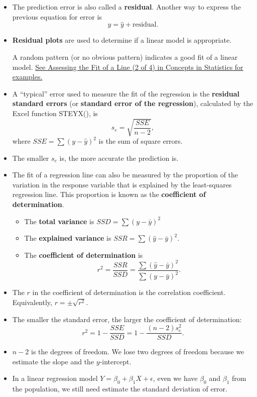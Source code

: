 \begin{itemize}
\item
  The prediction error is also called a \textbf{residual}. Another way
  to express the previous equation for error is
  \[y=\hat{y}+\text{residual}.\]
\item
  \textbf{Residual plots} are used to determine if a linear model is
  appropriate.

  A random pattern (or no obvious pattern) indicates a good fit of a
  linear model.
  \href{https://courses.lumenlearning.com/wmopen-concepts-statistics/chapter/assessing-the-fit-of-a-line-2-of-4/}{See
  Assessing the Fit of a Line (2 of 4) in Concepts in Statistics for
  examples.}
\item
  A ``typical'' error used to measure the fit of the regression is the
  \textbf{residual standard errors} (or \textbf{standard error of the
  regression}), calculated by the Excel function \textsf{STEYX()}, is
  \[s_e=\sqrt{\dfrac{SSE}{n-2}},\] where \(SSE=\sum (y-\hat{y})^2\) is
  the sum of square errors.
\item
  The smaller \(s_e\) is, the more accurate the prediction is.
\item
  The fit of a regression line can also be measured by the proportion of
  the variation in the response variable that is explained by the
  least-squares regression line. This proportion is known as the
  \textbf{coefficient of determination}.

  \begin{itemize}
  \item
    The \textbf{total variance} is \(SSD=\sum(y-\bar{y})^2\)
  \item
    The \textbf{explained variance} is \(SSR=\sum(\hat{y}-\bar{y})^2\).
  \item
    The \textbf{coefficient of determination} is
    \[r^2=\dfrac{SSR}{SSD}=\dfrac{\sum(\hat{y}-\bar{y})^2}{\sum(y-\bar{y})^2}.\]
  \end{itemize}
\end{itemize}

\begin{remark}

\begin{itemize}
\item
  The \(r\) in the coefficient of determination is the correlation
  coefficient. Equivalently, \(r=\pm\sqrt{r^2}\).
\item
  The smaller the standard error, the larger the coefficient of
  determination: \[r^2=1-\dfrac{SSE}{SSD}=1-\dfrac{(n-2)s_e^2}{SSD}.\]
\item
  \(n-2\) is the degrees of freedom. We lose two degrees of freedom
  because we estimate the slope and the \(y\)-intercept.
\item
  In a linear regression model \(Y=\beta_0 + \beta_1 X +\epsilon\), even
  we have \(\beta_0\) and \(\beta_1\) from the population, we still need
  estimate the standard deviation of error.
\end{itemize}

\end{remark}

